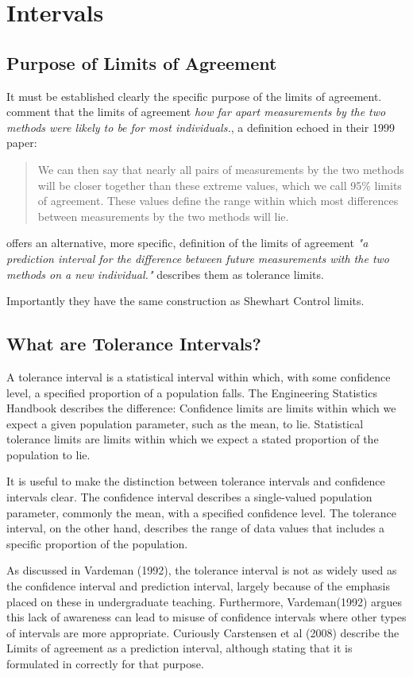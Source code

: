 	\section{Intervals}
	
	\subsection{Purpose of Limits of Agreement} It must be established
	clearly the specific purpose of the limits of agreement.
	\citet*{BA95} comment that the limits of agreement \emph{how far
		apart measurements by the two methods were likely to be for most
		individuals.}, a definition echoed in their 1999 paper:
	\begin{quote} We can then say that nearly all pairs
		of measurements by the two methods will be closer together than
		these extreme values, which we call 95\% limits of agreement.
		These values define the range within which most differences
		between measurements by the two methods will lie\citep{BA99}.
	\end{quote}
	\citet{BXC} offers an alternative, more specific,  definition of
	the limits of agreement \emph{"a prediction interval for the
		difference between future measurements with the two methods on a
		new individual."} \citet{luiz} describes them as tolerance limits.
	
	Importantly they have the same construction as Shewhart Control
	limits.
	
	
	\subsection*{What are Tolerance Intervals?}
	A tolerance interval is a statistical interval within which, with some confidence level, a specified proportion of a population falls.
	The Engineering Statistics Handbook describes the difference: Confidence limits are limits within which we expect a given population parameter, such as the mean, to lie. Statistical tolerance limits are limits within which we expect a stated proportion of the population to lie.
	
	It is useful to make the distinction between tolerance intervals and confidence intervals clear. The confidence interval describes a single-valued population parameter, commonly the mean, with a specified confidence level. The tolerance interval, on the other hand, describes the range of data values that includes a specific proportion of the population.
	
	As discussed in Vardeman (1992), the tolerance interval is not as widely used as the confidence interval and prediction interval, largely because of the emphasis placed on these in undergraduate teaching. Furthermore, Vardeman(1992) argues this lack of awareness can lead to misuse of confidence intervals where other types of intervals are more appropriate.
	Curiously Carstensen et al (2008) describe the Limits of agreement as a prediction interval, although stating that it is formulated in correctly for that purpose.
	
